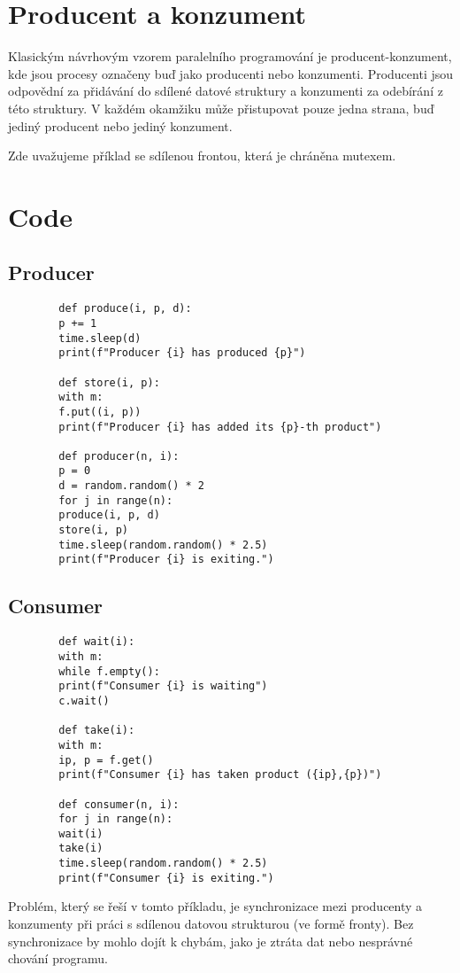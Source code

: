 \documentclass{article}
\begin{document}
		
	\section*{Producent a konzument}
	
Klasickým návrhovým vzorem paralelního programování je producent-konzument, kde jsou procesy označeny buď jako producenti nebo konzumenti. Producenti jsou odpovědní za přidávání do sdílené datové struktury a konzumenti za odebírání z této struktury. V každém okamžiku může přistupovat pouze jedna strana, buď jediný producent nebo jediný konzument.

Zde uvažujeme příklad se sdílenou frontou, která je chráněna mutexem.
	
	\section*{Code}
	
	\subsection*{Producer}
	
	\begin{verbatim}
		def produce(i, p, d):
		p += 1
		time.sleep(d)
		print(f"Producer {i} has produced {p}")
		
		def store(i, p):
		with m:
		f.put((i, p))
		print(f"Producer {i} has added its {p}-th product")
		
		def producer(n, i):
		p = 0
		d = random.random() * 2
		for j in range(n):
		produce(i, p, d)
		store(i, p)
		time.sleep(random.random() * 2.5)
		print(f"Producer {i} is exiting.")
	\end{verbatim}
	
	\subsection*{Consumer}
	
	\begin{verbatim}
		def wait(i):
		with m:
		while f.empty():
		print(f"Consumer {i} is waiting")
		c.wait()
		
		def take(i):
		with m:
		ip, p = f.get()
		print(f"Consumer {i} has taken product ({ip},{p})")
		
		def consumer(n, i):
		for j in range(n):
		wait(i)
		take(i)
		time.sleep(random.random() * 2.5)
		print(f"Consumer {i} is exiting.")
	\end{verbatim}
	
Problém, který se řeší v tomto příkladu, je synchronizace mezi producenty a konzumenty při práci s sdílenou datovou strukturou (ve formě fronty). Bez synchronizace by mohlo dojít k chybám, jako je ztráta dat nebo nesprávné chování programu.
\end{document}
